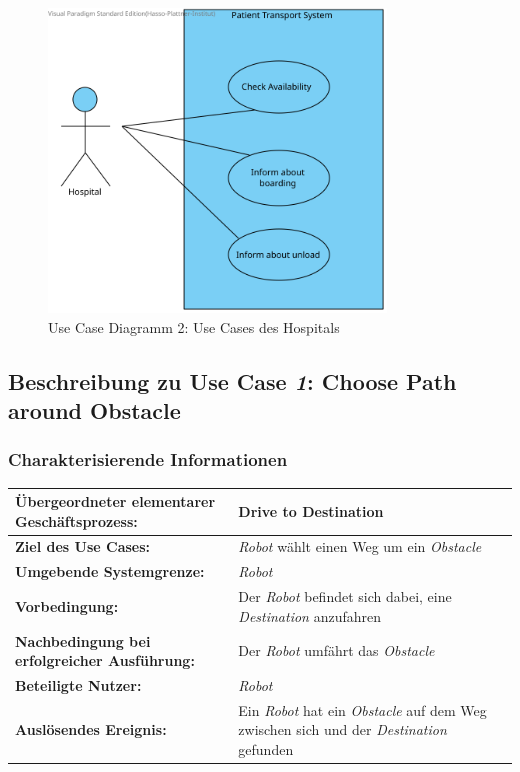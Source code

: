 			\begin{figure}[H]
				\centering
				\includegraphics[width=0.8\textwidth]{img/1-Analyse-3-Hospital}
				\caption{Use Case Diagramm 2: Use Cases des Hospitals}
				\label{fig:3-1-hospital-use-cases}
			\end{figure}

		\pagebreak

		\subsection{Beschreibung zu Use Case \emph{1}: Choose Path around Obstacle}

			\subsubsection*{Charakterisierende Informationen}

			\begin{table}[H]
				\centering
				\begin{tabularx}{\textwidth}{|p{5cm}|X|}
				\hline
				\textbf{Übergeordneter elementarer Geschäftsprozess:} & Drive to Destination\\ \hline
				\textbf{Ziel des Use Cases:} & \emph{Robot} wählt einen Weg um ein \emph{Obstacle} \\ \hline
				\textbf{Umgebende Systemgrenze:} & \emph{Robot} \\ \hline
				\textbf{Vorbedingung:} & Der \emph{Robot} befindet sich dabei, eine \emph{Destination} anzufahren \\ \hline
				\textbf{Nachbedingung bei erfolgreicher Ausführung:} & 
				Der \emph{Robot} umfährt das \emph{Obstacle} \\ \hline
				\textbf{Beteiligte Nutzer:} & \emph{Robot} \\ \hline
				\textbf{Auslösendes Ereignis:} & Ein \emph{Robot} hat ein \emph{Obstacle} auf dem Weg zwischen sich und der \emph{Destination} gefunden\\ \hline
				\end{tabularx}
			\end{table}

